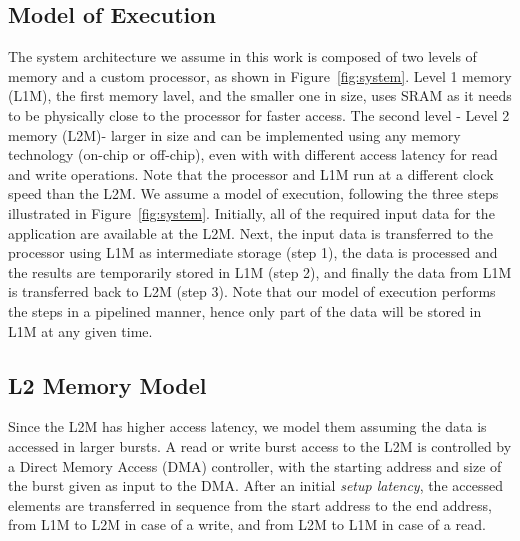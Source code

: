 \subsection{Model of Execution}
\label{ssec:system_under_analysis}
The system architecture we assume in this work is composed of two levels of memory and a custom processor, as shown in Figure~\ref{fig:system}. Level 1 memory (L1M)\footnotemark, the first memory lavel, and the smaller one in size, uses SRAM as it needs to be physically close to the processor for faster access. The second level - Level 2 memory (L2M)\footnotemark[\value{footnote}] - larger in size and can be implemented using any memory technology (on-chip or off-chip), even with with different access latency for read and write operations. Note that the processor and L1M run at a different clock speed than the L2M. 
We assume a model of execution, following the three steps illustrated in Figure~\ref{fig:system}. Initially, all of the required input data for the application are available at the L2M. Next, the input data is transferred to the processor using L1M as intermediate storage (step 1), the data is processed and the results are temporarily stored in L1M (step 2), and finally the data from L1M is transferred back to L2M (step 3). Note that our model of execution performs the steps in a pipelined manner, hence only part of the data will be stored in L1M at any given time. 



\subsection{L2 Memory Model}
\label{ssec:layer2_model}
Since the L2M has higher access latency, we model them assuming the data is accessed in larger bursts.
A read or write burst access to the L2M is controlled by a Direct Memory Access (DMA) controller, with the starting address and size of the burst given as input to the DMA. After an initial \textit{setup latency}, the accessed elements are transferred in sequence from the start address to the end address, from L1M to L2M in case of a write, and from L2M to L1M in case of a read.

